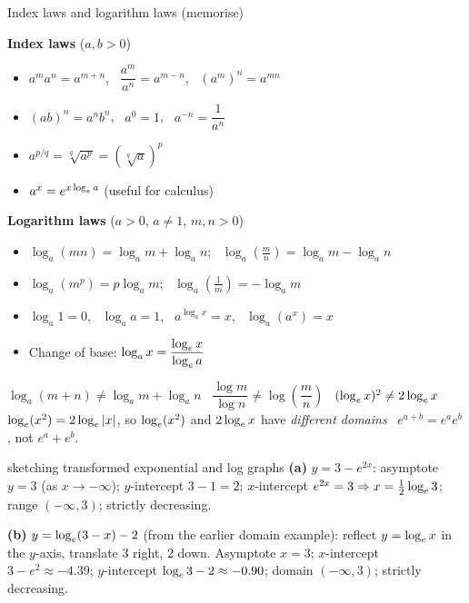 \begin{keyres}{Index laws and logarithm laws (memorise)}
\begin{cols}
\textbf{Index laws} ($a,b>0$)
\begin{itemize}
  \item $a^ma^n=a^{m+n}$, \ $\dfrac{a^m}{a^n}=a^{m-n}$, \ $(a^m)^n=a^{mn}$
  \item $(ab)^n=a^nb^n$, \ $a^0=1$, \ $a^{-n}=\dfrac{1}{a^n}$
  \item $a^{p/q}=\sqrt[q]{a^p}=\left(\sqrt[q]{a}\right)^p$
  \item $a^{x}=e^{x\log_e a}$ (useful for calculus)
\end{itemize}
\nextcol
\textbf{Logarithm laws} ($a>0$, $a\ne1$, $m,n>0$)
\begin{itemize}
  \item $\log_a(mn)=\log_a m+\log_a n$; \ $\log_a\!\left(\frac{m}{n}\right)=\log_a m-\log_a n$
  \item $\log_a(m^p)=p\log_a m$; \ $\log_a\!\left(\frac1m\right)=-\log_a m$
  \item $\log_a1=0$, \ $\log_a a=1$, \ $a^{\log_a x}=x$, \ $\log_a(a^x)=x$
  \item Change of base: $\log_a x=\dfrac{\log_e x}{\log_e a}$
\end{itemize}
\end{cols}
\end{keyres}

\begin{warn}
$\log_a(m+n)\ne\log_a m+\log_a n$ \textbullet\ $\dfrac{\log m}{\log n}\ne\log\!\left(\dfrac mn\right)$ \textbullet\ $(\log_e x)^2\ne2\log_e x$ \textbullet\ $\log_e(x^2)=2\log_e|x|$, so $\log_e(x^2)$ and $2\log_e x$ have \emph{different domains} \textbullet\ $e^{a+b}=e^ae^b$, not $e^a+e^b$.
\end{warn}

\begin{example}{sketching transformed exponential and log graphs \byhand}
\textbf{(a)} $y=3-e^{2x}$: asymptote $y=3$ (as $x\to-\infty$); $y$-intercept $3-1=2$; $x$-intercept $e^{2x}=3\Rightarrow x=\frac12\log_e3$; range $(-\infty,3)$; strictly decreasing.\par
\textbf{(b)} $y=\log_e(3-x)-2$ (from the earlier domain example): reflect $y=\log_e x$ in the $y$-axis, translate 3 right, 2 down. Asymptote $x=3$; $x$-intercept $3-e^2\approx-4.39$; $y$-intercept $\log_e3-2\approx-0.90$; domain $(-\infty,3)$; strictly decreasing.
\end{example}

